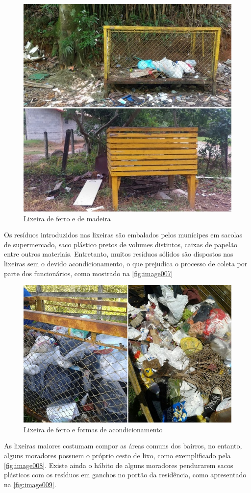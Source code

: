 \begin{figure}
	\centering
	\includegraphics[width=0.7\linewidth]{produtos/prodtres/image006}
	\caption{Lixeira de ferro e de madeira}
	\label{fig:image006}
\end{figure}

Os resíduos introduzidos nas lixeiras são embalados pelos munícipes em sacolas de supermercado, saco plástico pretos de volumes distintos, caixas de papelão entre outros materiais. Entretanto, muitos resíduos sólidos são dispostos nas lixeiras sem o devido acondicionamento, o que prejudica o processo de coleta por parte dos funcionários, como mostrado na \autoref{fig:image007}

\begin{figure}
	\centering
	\includegraphics[width=0.7\linewidth]{produtos/prodtres/image007}
	\caption{Lixeira de ferro e formas de acondicionamento}
	\label{fig:image007}
\end{figure}


As lixeiras maiores costumam compor as áreas comuns dos bairros, no entanto, alguns moradores possuem o próprio cesto de lixo, como exemplificado pela \autoref{fig:image008}. Existe ainda o hábito de alguns moradores pendurarem sacos plásticos com os resíduos em ganchos no portão da residência, como apresentado na \autoref{fig:image009}.

